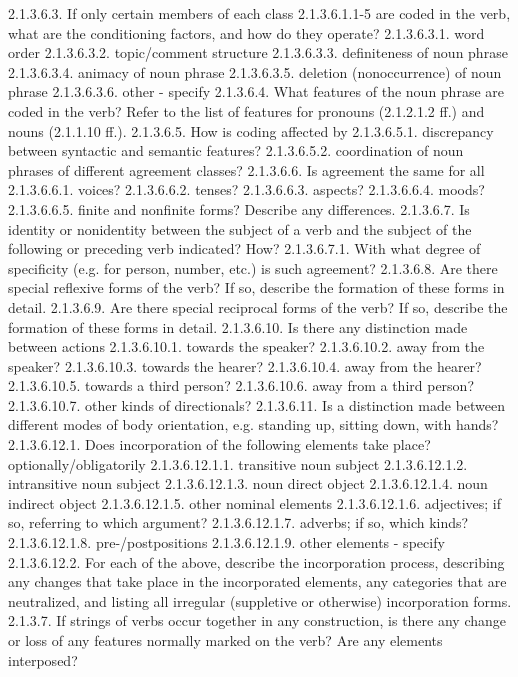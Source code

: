 2.1.3.6.3. If only certain members of each class 2.1.3.6.1.1-5 are coded in the verb, what are the conditioning factors, and how do they operate?
2.1.3.6.3.1. word order
2.1.3.6.3.2. topic/comment structure
2.1.3.6.3.3. definiteness of noun phrase
2.1.3.6.3.4. animacy of noun phrase
2.1.3.6.3.5. deletion (nonoccurrence) of noun phrase
2.1.3.6.3.6. other - specify
2.1.3.6.4. What features of the noun phrase are coded in the verb? Refer to the list of features for pronouns (2.1.2.1.2 ff.) and nouns (2.1.1.10 ff.).
2.1.3.6.5. How is coding affected by
2.1.3.6.5.1. discrepancy between syntactic and semantic features?
2.1.3.6.5.2. coordination of noun phrases of different agreement classes?
2.1.3.6.6. Is agreement the same for all
2.1.3.6.6.1. voices?
2.1.3.6.6.2. tenses?
2.1.3.6.6.3. aspects?
2.1.3.6.6.4. moods?
2.1.3.6.6.5. finite and nonfinite forms?
Describe any differences.
2.1.3.6.7. Is identity or nonidentity between the subject of a verb and the subject of the following or preceding verb indicated? How?
2.1.3.6.7.1. With what degree of specificity (e.g. for person, number, etc.) is such agreement?
2.1.3.6.8. Are there special reflexive forms of the verb? If so, describe the formation of these forms in detail.
2.1.3.6.9. Are there special reciprocal forms of the verb? If so, describe the formation of these forms in detail.
2.1.3.6.10. Is there any distinction made between actions
2.1.3.6.10.1. towards the speaker?
2.1.3.6.10.2. away from the speaker?
2.1.3.6.10.3. towards the hearer?
2.1.3.6.10.4. away from the hearer?
2.1.3.6.10.5. towards a third person?
2.1.3.6.10.6. away from a third person?
2.1.3.6.10.7. other kinds of directionals?
2.1.3.6.11. Is a distinction made between different modes of body orientation, e.g. standing up, sitting down, with hands?
2.1.3.6.12.1. Does incorporation of the following elements take place? optionally/obligatorily
2.1.3.6.12.1.1. transitive noun subject
2.1.3.6.12.1.2. intransitive noun subject
2.1.3.6.12.1.3. noun direct object
2.1.3.6.12.1.4. noun indirect object
2.1.3.6.12.1.5. other nominal elements
2.1.3.6.12.1.6. adjectives; if so, referring to which argument?
2.1.3.6.12.1.7. adverbs; if so, which kinds?
2.1.3.6.12.1.8. pre-/postpositions
2.1.3.6.12.1.9. other elements - specify
2.1.3.6.12.2. For each of the above, describe the incorporation process, describing any changes that take place in the incorporated elements, any categories that are neutralized, and listing all irregular (suppletive or otherwise) incorporation forms.
2.1.3.7. If strings of verbs occur together in any construction, is there any change or loss of any features normally marked on the verb? Are any elements interposed?



